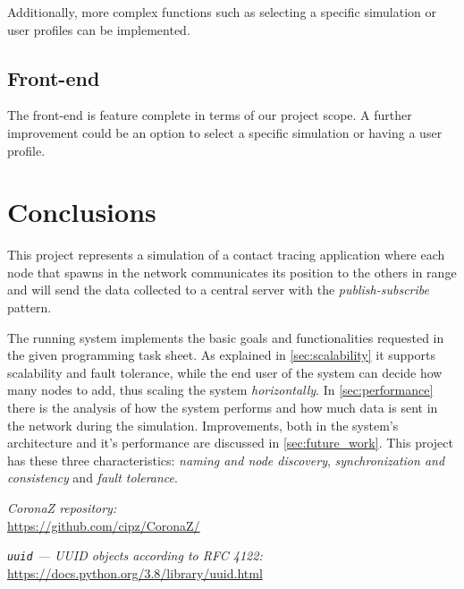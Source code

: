 \documentclass[conference]{IEEEtran}
\begin{document}
		Additionally, more complex functions such as selecting a specific simulation or user profiles can be implemented.
	
	\subsection{Front-end}
	
		The front-end is feature complete in terms of our project scope. A further improvement could be an option to select a specific simulation or having a user profile.
	
\section{Conclusions}\label{sec:conclusions}

	This project represents a simulation of a contact tracing application where each node that spawns in the network communicates its position to the others in range and will send the data collected to a central server with the \textit{publish-subscribe} pattern.
	
	The running system implements the basic goals and functionalities requested in the given programming task sheet.
	As explained in \ref{sec:scalability} it supports scalability and fault tolerance, while the end user of the system can decide how many nodes to add, thus scaling the system \textit{horizontally}.
	In \ref{sec:performance} there is the analysis of how the system performs and how much data is sent in the network during the simulation.
	Improvements, both in the system's architecture and it's performance are discussed in \ref{sec:future_work}.
	This project has these three characteristics: \textit{naming and node discovery}, \textit{synchronization and consistency} and \textit{fault tolerance}.

\begin{thebibliography}{00}
	
		\textit{CoronaZ repository:}\\
		\url{https://github.com/cipz/CoronaZ/}
	
		\textit{\texttt{uuid} — UUID objects according to RFC 4122:}\\
		\url{https://docs.python.org/3.8/library/uuid.html}
		
\end{thebibliography}
\end{document}
